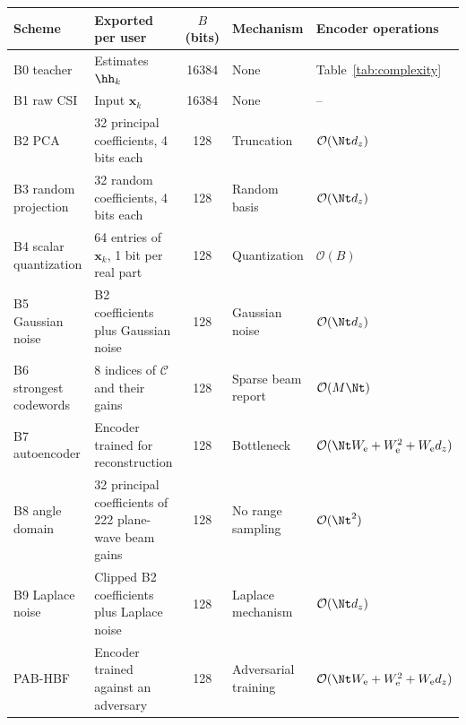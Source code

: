\begin{tabular}{llcll}
\toprule
Scheme & Exported per user & $B$ (bits) & Mechanism & Encoder operations\\
\midrule
B0 teacher & Estimates $\hh_k$ & 16384 & None & Table~\ref{tab:complexity}\\
B1 raw CSI & Input $\mathbf{x}_k$ & 16384 & None & --\\
B2 PCA & 32 principal coefficients, 4 bits each & 128 & Truncation & $\mathcal{O}(\Nt d_z)$\\
B3 random projection & 32 random coefficients, 4 bits each & 128 & Random basis & $\mathcal{O}(\Nt d_z)$\\
B4 scalar quantization & 64 entries of $\mathbf{x}_k$, 1 bit per real part & 128 & Quantization & $\mathcal{O}(B)$\\
B5 Gaussian noise & B2 coefficients plus Gaussian noise & 128 & Gaussian noise & $\mathcal{O}(\Nt d_z)$\\
B6 strongest codewords & 8 indices of $\mathcal{C}$ and their gains & 128 & Sparse beam report & $\mathcal{O}(M\Nt)$\\
B7 autoencoder & Encoder trained for reconstruction & 128 & Bottleneck & $\mathcal{O}(\Nt W_{\mathrm{e}}+W_{\mathrm{e}}^2+W_{\mathrm{e}}d_z)$\\
B8 angle domain & 32 principal coefficients of 222 plane-wave beam gains & 128 & No range sampling & $\mathcal{O}(\Nt^2)$\\
B9 Laplace noise & Clipped B2 coefficients plus Laplace noise & 128 & Laplace mechanism & $\mathcal{O}(\Nt d_z)$\\
PAB-HBF & Encoder trained against an adversary & 128 & Adversarial training & $\mathcal{O}(\Nt W_{\mathrm{e}}+W_{\mathrm{e}}^2+W_{\mathrm{e}}d_z)$\\
\bottomrule
\end{tabular}
